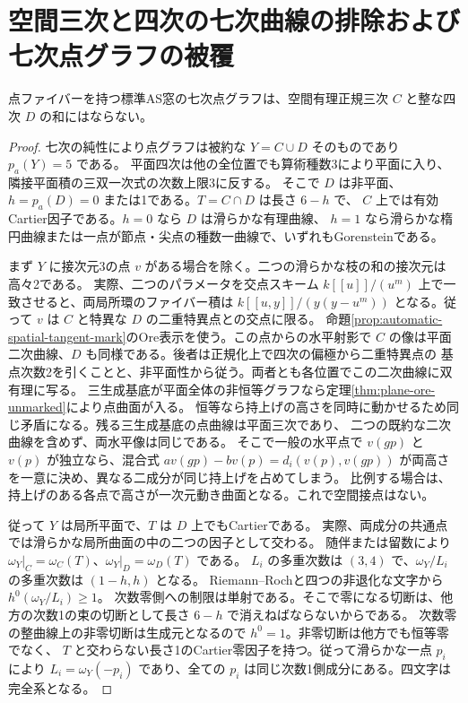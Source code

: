 \section{空間三次と四次の七次曲線の排除および七次点グラフの被覆}
\label{sec:reducible-septic-coverage}
\begin{theorem}\label{thm:spatial-cubic-quartic-septic}
点ファイバーを持つ標準AS窓の七次点グラフは、空間有理正規三次 $C$ と整な四次 $D$ の和にはならない。
\end{theorem}
\begin{proof}
七次の純性により点グラフは被約な $Y=C\cup D$ そのものであり $p_a(Y)=5$ である。
平面四次は他の全位置でも算術種数3により平面に入り、隣接平面積の三双一次式の次数上限3に反する。
そこで $D$ は非平面、$h=p_a(D)=0$ または1である。$T=C\cap D$ は長さ $6-h$ で、
$C$ 上では有効Cartier因子である。$h=0$ なら $D$ は滑らかな有理曲線、
$h=1$ なら滑らかな楕円曲線または一点が節点・尖点の種数一曲線で、いずれもGorensteinである。

まず $Y$ に接次元3の点 $v$ がある場合を除く。二つの滑らかな枝の和の接次元は高々2である。
実際、二つのパラメータを交点スキーム $k[[u]]/(u^m)$ 上で一致させると、両局所環のファイバー積は
$k[[u,y]]/(y(y-u^m))$ となる。従って $v$ は $C$ と特異な $D$ の二重特異点との交点に限る。
命題\ref{prop:automatic-spatial-tangent-mark}のOre表示を使う。この点からの水平射影で
$C$ の像は平面二次曲線、$D$ も同様である。後者は正規化上で四次の偏極から二重特異点の
基点次数2を引くことと、非平面性から従う。両者とも各位置でこの二次曲線に双有理に写る。
三生成基底が平面全体の非恒等グラフなら定理\ref{thm:plane-ore-unmarked}により点曲面が入る。
恒等なら持上げの高さを同時に動かせるため同じ矛盾になる。残る三生成基底の点曲線は平面三次であり、
二つの既約な二次曲線を含めず、両水平像は同じである。
そこで一般の水平点で $v(gp)$ と $v(p)$ が独立なら、混合式
$a v(gp)-b v(p)=d_i(v(p),v(gp))$ が両高さを一意に決め、異なる二成分が同じ持上げを占めてしまう。
比例する場合は、持上げのある各点で高さが一次元動き曲面となる。これで空間接点はない。

従って $Y$ は局所平面で、$T$ は $D$ 上でもCartierである。
実際、両成分の共通点では滑らかな局所曲面の中の二つの因子として交わる。
随伴または留数により $\omega_Y|_C=\omega_C(T)$、$\omega_Y|_D=\omega_D(T)$ である。
$L_i$ の多重次数は $(3,4)$ で、$\omega_Y/L_i$ の多重次数は $(1-h,h)$ となる。
Riemann--Rochと四つの非退化な文字から $h^0(\omega_Y/L_i)\ge1$。
次数零側への制限は単射である。そこで零になる切断は、他方の次数1の束の切断として長さ $6-h$ で消えねばならないからである。
次数零の整曲線上の非零切断は生成元となるので $h^0=1$。非零切断は他方でも恒等零でなく、
$T$ と交わらない長さ1のCartier零因子を持つ。従って滑らかな一点 $p_i$ により
$L_i=\omega_Y(-p_i)$ であり、全ての $p_i$ は同じ次数1側成分にある。四文字は完全系となる。


\end{proof}
